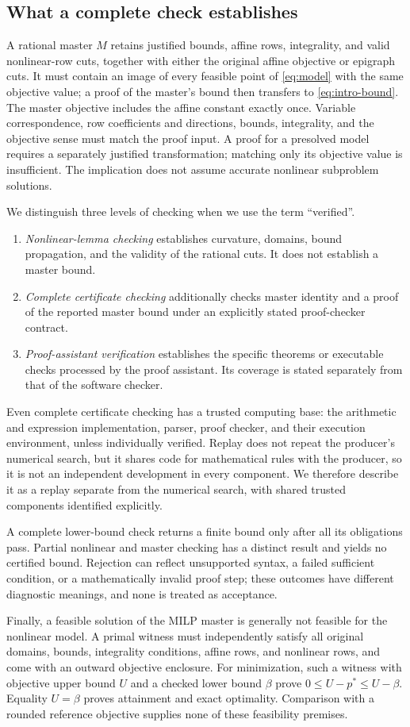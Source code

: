 \subsection{What a complete check establishes}
A rational master $M$ retains justified bounds, affine rows, integrality, and valid nonlinear-row cuts, together with either the original affine objective or epigraph cuts. It must contain an image of every feasible point of \eqref{eq:model} with the same objective value; a proof of the master's bound then transfers to \eqref{eq:intro-bound}. The master objective includes the affine constant exactly once. Variable correspondence, row coefficients and directions, bounds, integrality, and the objective sense must match the proof input. A proof for a presolved model requires a separately justified transformation; matching only its objective value is insufficient. The implication does not assume accurate nonlinear subproblem solutions.

We distinguish three levels of checking when we use the term ``verified''.
\begin{enumerate}
\item \emph{Nonlinear-lemma checking} establishes curvature, domains, bound propagation, and the validity of the rational cuts. It does not establish a master bound.
\item \emph{Complete certificate checking} additionally checks master identity and a proof of the reported master bound under an explicitly stated proof-checker contract.
\item \emph{Proof-assistant verification} establishes the specific theorems or executable checks processed by the proof assistant. Its coverage is stated separately from that of the software checker.
\end{enumerate}
Even complete certificate checking has a trusted computing base: the arithmetic and expression implementation, parser, proof checker, and their execution environment, unless individually verified. Replay does not repeat the producer's numerical search, but it shares code for mathematical rules with the producer, so it is not an independent development in every component. We therefore describe it as a replay separate from the numerical search, with shared trusted components identified explicitly.

A complete lower-bound check returns a finite bound only after all its obligations pass. Partial nonlinear and master checking has a distinct result and yields no certified bound. Rejection can reflect unsupported syntax, a failed sufficient condition, or a mathematically invalid proof step; these outcomes have different diagnostic meanings, and none is treated as acceptance.

Finally, a feasible solution of the MILP master is generally not feasible for the nonlinear model. A primal witness must independently satisfy all original domains, bounds, integrality conditions, affine rows, and nonlinear rows, and come with an outward objective enclosure. For minimization, such a witness with objective upper bound $U$ and a checked lower bound $\beta$ prove $0\leq U-p^*\leq U-\beta$. Equality $U=\beta$ proves attainment and exact optimality. Comparison with a rounded reference objective supplies none of these feasibility premises.
